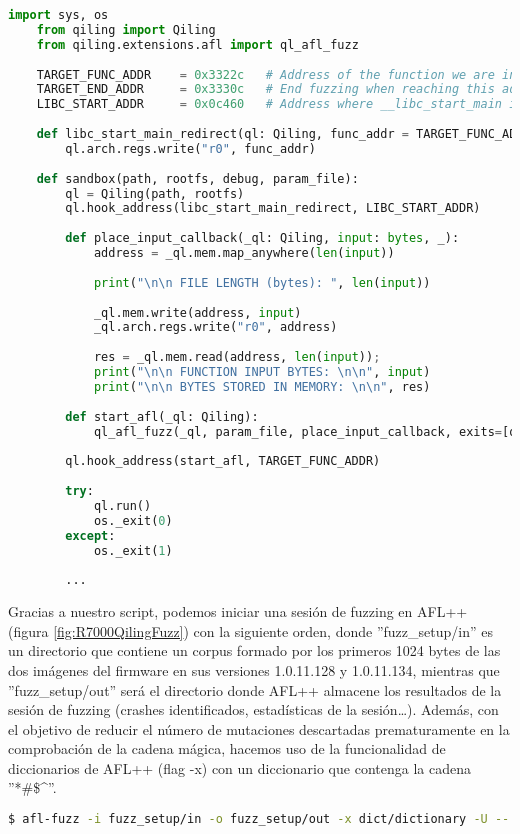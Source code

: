 \begin{lstlisting}[language=python, caption=Script de fuzzing de UPNP para Qiling., captionpos=b,
    frame=single, breaklines, showstringspaces=false]
    import sys, os
    from qiling import Qiling
    from qiling.extensions.afl import ql_afl_fuzz
    
    TARGET_FUNC_ADDR    = 0x3322c   # Address of the function we are interested in
    TARGET_END_ADDR     = 0x3330c   # End fuzzing when reaching this address
    LIBC_START_ADDR     = 0x0c460   # Address where __libc_start_main is being called
        
    def libc_start_main_redirect(ql: Qiling, func_addr = TARGET_FUNC_ADDR):
        ql.arch.regs.write("r0", func_addr)
        
    def sandbox(path, rootfs, debug, param_file):
        ql = Qiling(path, rootfs)
        ql.hook_address(libc_start_main_redirect, LIBC_START_ADDR)
        
        def place_input_callback(_ql: Qiling, input: bytes, _):
            address = _ql.mem.map_anywhere(len(input))
            
            print("\n\n FILE LENGTH (bytes): ", len(input))
            
            _ql.mem.write(address, input)
            _ql.arch.regs.write("r0", address)
            
            res = _ql.mem.read(address, len(input));
            print("\n\n FUNCTION INPUT BYTES: \n\n", input)
            print("\n\n BYTES STORED IN MEMORY: \n\n", res)
            
        def start_afl(_ql: Qiling):
            ql_afl_fuzz(_ql, param_file, place_input_callback, exits=[ql.os.exit_point])
        
        ql.hook_address(start_afl, TARGET_FUNC_ADDR)
    
        try:
            ql.run()
            os._exit(0)
        except:
            os._exit(1)
        
        ...
\end{lstlisting}

Gracias a nuestro script, podemos iniciar una sesión de fuzzing en AFL++ (figura \ref{fig:R7000QilingFuzz}) con la siguiente orden, donde ''fuzz\_setup/in''
es un directorio que contiene un corpus formado por los primeros 1024 bytes de las dos imágenes del firmware en sus versiones 1.0.11.128 y 1.0.11.134,
mientras que ''fuzz\_setup/out'' será el directorio donde AFL++ almacene los resultados de la sesión de fuzzing (crashes identificados, estadísticas de 
la sesión\dots). Además, con el objetivo de reducir el número de mutaciones descartadas prematuramente en la comprobación de la cadena mágica, 
hacemos uso de la funcionalidad de diccionarios de AFL++ (flag -x) con un diccionario que contenga la cadena ''*\#\$\textasciicircum''.
\begin{lstlisting}[language=bash, breaklines]
    $ afl-fuzz -i fuzz_setup/in -o fuzz_setup/out -x dict/dictionary -U -- python3 ./src/dev/fuzz.py @@
\end{lstlisting}

